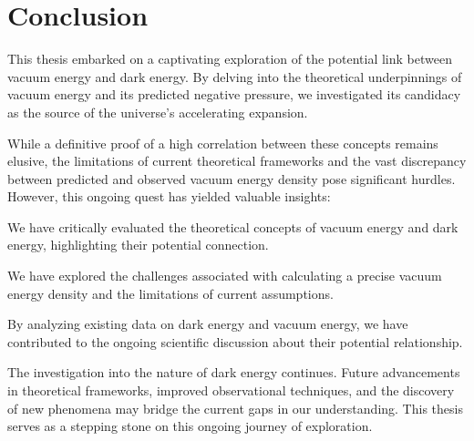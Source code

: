 \section{Conclusion}

This thesis embarked on a captivating exploration of the potential link between vacuum energy and dark energy.  By delving into the theoretical underpinnings of vacuum energy and its predicted negative pressure, we investigated its candidacy as the source of the universe's accelerating expansion.

While a definitive proof of a high correlation between these concepts remains elusive, the limitations of current theoretical frameworks and the vast discrepancy between predicted and observed vacuum energy density pose significant hurdles.  However, this ongoing quest has yielded valuable insights:

We have critically evaluated the theoretical concepts of vacuum energy and dark energy, highlighting their potential connection.

We have explored the challenges associated with calculating a precise vacuum energy density and the limitations of current assumptions.

By analyzing existing data on dark energy and vacuum energy, we have contributed to the ongoing scientific discussion about their potential relationship.

The investigation into the nature of dark energy continues.  Future advancements in theoretical frameworks, improved observational techniques, and the discovery of new phenomena may bridge the current gaps in our understanding.  This thesis serves as a stepping stone on this ongoing journey of exploration.